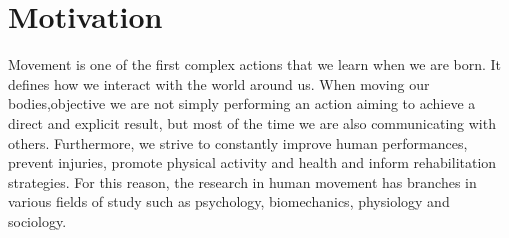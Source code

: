 \section{Motivation}

Movement is one of the first complex actions that we learn when we are born. It defines how we interact with the world around us. 
When moving our bodies,objective we are not simply performing an action aiming to achieve a direct and explicit result, but most of the time we are also communicating with others.
Furthermore, we strive to constantly improve human performances, prevent injuries, promote physical activity and health and inform rehabilitation strategies.
For this reason, the research in human movement has branches in various fields of study such as psychology, biomechanics, physiology and sociology.